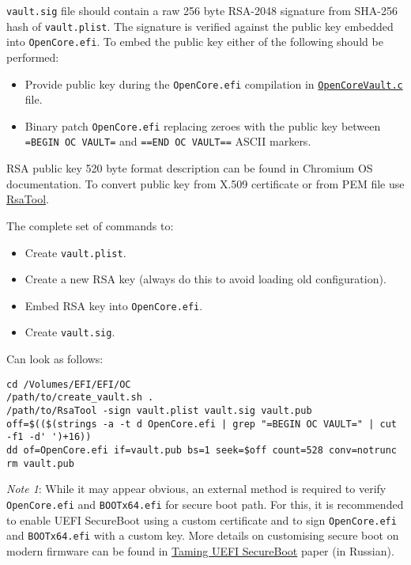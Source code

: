 \documentclass[]{article}
\providecommand{\tightlist}{%
  \setlength{\itemsep}{0pt}\setlength{\parskip}{0pt}}
\begin{document}
\begin{enumerate}
  \texttt{vault.sig} file should contain a raw 256 byte RSA-2048 signature from SHA-256
  hash of \texttt{vault.plist}. The signature is verified against the public
  key embedded into \texttt{OpenCore.efi}. To embed the public key either of the following should be performed:

  \begin{itemize}
  \tightlist
  \item Provide public key during the \texttt{OpenCore.efi} compilation in
  \href{https://github.com/acidanthera/OpenCorePkg/blob/master/Platform/OpenCore/OpenCoreVault.c}{\texttt{OpenCoreVault.c}} file.
  \item Binary patch \texttt{OpenCore.efi} replacing zeroes with the public key
  between \texttt{=BEGIN OC VAULT=} and \texttt{==END OC VAULT==} ASCII markers.
  \end{itemize}

  RSA public key 520 byte format description can be found in Chromium OS documentation.
  To convert public key from X.509 certificate or from PEM file use
  \href{https://github.com/acidanthera/OpenCorePkg/tree/master/Utilities/CreateVault}{RsaTool}.


  The complete set of commands to:

  \begin{itemize}
  \tightlist
  \item Create \texttt{vault.plist}.
  \item Create a new RSA key (always do this to avoid loading old configuration).
  \item Embed RSA key into \texttt{OpenCore.efi}.
  \item Create \texttt{vault.sig}.
  \end{itemize}

  Can look as follows:
\begin{lstlisting}[label=createvault, style=ocbash]
cd /Volumes/EFI/EFI/OC
/path/to/create_vault.sh .
/path/to/RsaTool -sign vault.plist vault.sig vault.pub
off=$(($(strings -a -t d OpenCore.efi | grep "=BEGIN OC VAULT=" | cut -f1 -d' ')+16))
dd of=OpenCore.efi if=vault.pub bs=1 seek=$off count=528 conv=notrunc
rm vault.pub
\end{lstlisting}

  \emph{Note 1}: While it may appear obvious, an external
  method is required to verify \texttt{OpenCore.efi} and \texttt{BOOTx64.efi} for
  secure boot path. For this, it is recommended to enable UEFI SecureBoot
  using a custom certificate and to sign \texttt{OpenCore.efi} and \texttt{BOOTx64.efi}
  with a custom key. More details on customising secure boot on modern firmware
  can be found in \href{https://habr.com/post/273497/}{Taming UEFI SecureBoot}
  paper (in Russian).


\end{enumerate}
\end{document}
